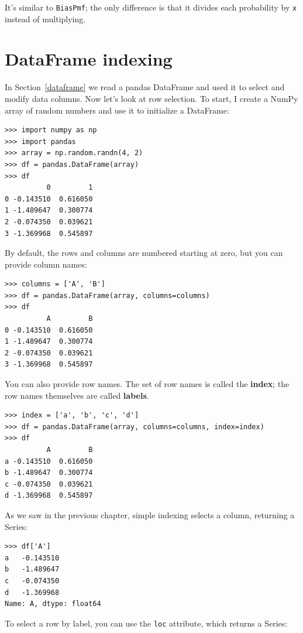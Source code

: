 \documentclass[12pt]{book}
\begin{document}
It's similar to \verb"BiasPmf"; the only difference is that it
divides each probability by \verb"x" instead of multiplying.


\section{DataFrame indexing}

In Section~\ref{dataframe} we read a pandas DataFrame and used it to
select and modify data columns.  Now let's look at row selection.
To start, I create a NumPy array of random numbers and use it
to initialize a DataFrame:

\begin{verbatim}
>>> import numpy as np
>>> import pandas
>>> array = np.random.randn(4, 2)
>>> df = pandas.DataFrame(array)
>>> df
          0         1
0 -0.143510  0.616050
1 -1.489647  0.300774
2 -0.074350  0.039621
3 -1.369968  0.545897
\end{verbatim}

By default, the rows and columns are numbered starting at zero, but
you can provide column names:

\begin{verbatim}
>>> columns = ['A', 'B']
>>> df = pandas.DataFrame(array, columns=columns)
>>> df
          A         B
0 -0.143510  0.616050
1 -1.489647  0.300774
2 -0.074350  0.039621
3 -1.369968  0.545897
\end{verbatim}

You can also provide row names.  The set of row names is called the
{\bf index}; the row names themselves are called {\bf labels}.

\begin{verbatim}
>>> index = ['a', 'b', 'c', 'd']
>>> df = pandas.DataFrame(array, columns=columns, index=index)
>>> df
          A         B
a -0.143510  0.616050
b -1.489647  0.300774
c -0.074350  0.039621
d -1.369968  0.545897
\end{verbatim}

As we saw in the previous chapter, simple indexing selects a
column, returning a Series:

\begin{verbatim}
>>> df['A']
a   -0.143510
b   -1.489647
c   -0.074350
d   -1.369968
Name: A, dtype: float64
\end{verbatim}

To select a row by label, you can use the \verb"loc" attribute, which
returns a Series:
\end{document}
